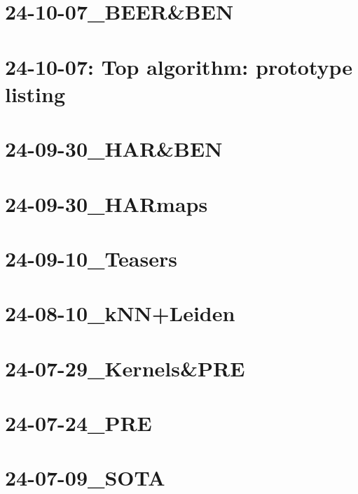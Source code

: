 \documentclass[11pt]{article}
\begin{document}
\clearpage

\tableofcontents


\clearpage

\section{24-10-07\_BEER\&BEN}

\section{24-10-07: Top algorithm: prototype listing}

\section{24-09-30\_HAR\&BEN}

\section{24-09-30\_HARmaps}

\section{24-09-10\_Teasers}

\section{24-08-10\_kNN+Leiden}

\section{24-07-29\_Kernels\&PRE}

\section{24-07-24\_PRE}

\section{24-07-09\_SOTA}


\printbibliography
\end{document}
